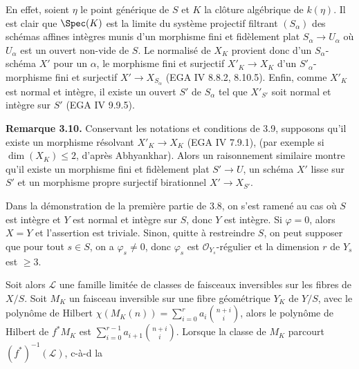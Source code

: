 En
effet, soient \(\eta\) le point g\'en\'erique de \(S\) et \(K\) la cl\^oture alg\'ebrique de \(k(\eta)\). Il est clair que \(\Spec(K)\) est la limite du syst\`eme projectif filtrant \((S_\alpha)\) des sch\'emas affines int\`egres munis d'un morphisme fini et fid\`element plat \(S_\alpha\to U_\alpha\) o\`u \(U_\alpha\) est un ouvert non-vide de \(S\). Le normalis\'e de \(X_K\) provient donc d'un \(S_\alpha\)-sch\'ema \(X'\) pour un \(\alpha\), le morphisme fini et surjectif \(X'_K\to X_K\) d'un \(S'_\alpha\)-morphisme fini et surjectif \(X'\to X_{S_\alpha}\) (EGA IV 8.8.2, 8.10.5). Enfin, comme \(X'_K\) est normal et int\`egre, il existe un ouvert \(S'\) de \(S_\alpha\) tel que \(X'_{S'}\) soit normal et int\`egre sur \(S'\) (EGA IV 9.9.5).

\textbf{Remarque 3.10.} Conservant les notations et conditions de 3.9, supposons qu'il existe un morphisme r\'esolvant \(X'_K\to X_K\) (EGA IV 7.9.1), (par exemple si \(\dim(X_K)\le2\), d'apr\`es Abhyankhar). Alors un raisonnement similaire montre qu'il existe un morphisme fini et fid\`element plat \(S'\to U\), un sch\'ema \(X'\) lisse sur \(S'\) et un morphisme propre surjectif birationnel \(X'\to X_{S'}\).

Dans la d\'emonstration de la premi\`ere partie de 3.8, on s'est ramen\'e au cas o\`u \(S\) est int\`egre et \(Y\) est normal et int\`egre sur \(S\), donc \(Y\) est int\`egre. Si \(\varphi=0\), alors \(X=Y\) et l'assertion est triviale. Sinon, quitte \`a restreindre \(S\), on peut supposer que pour tout \(s\in S\), on a \(\varphi_s\ne0\), donc \(\varphi_s\) est \(\mathcal O_{Y_s}\)-r\'egulier et la dimension \(r\) de \(Y_s\) est \(\ge3\).

Soit alors \(\mathcal L\) une famille limit\'ee de classes de faisceaux inversibles sur les fibres de \(X/S\). Soit \(M_K\) un faisceau inversible sur une fibre g\'eom\'etrique \(Y_K\) de \(Y/S\), avec le polyn\^ome de Hilbert \(\chi(M_K(n))=\sum_{i=0}^{r}a_i\binom{n+i}{i}\), alors le polyn\^ome de Hilbert de \(f^*M_K\) est \(\sum_{i=0}^{r-1}a_{i+1}\binom{n+i}{i}\). Lorsque la classe de \(M_K\) parcourt \((f^*)^{-1}(\mathcal L)\), c-\`a-d la
